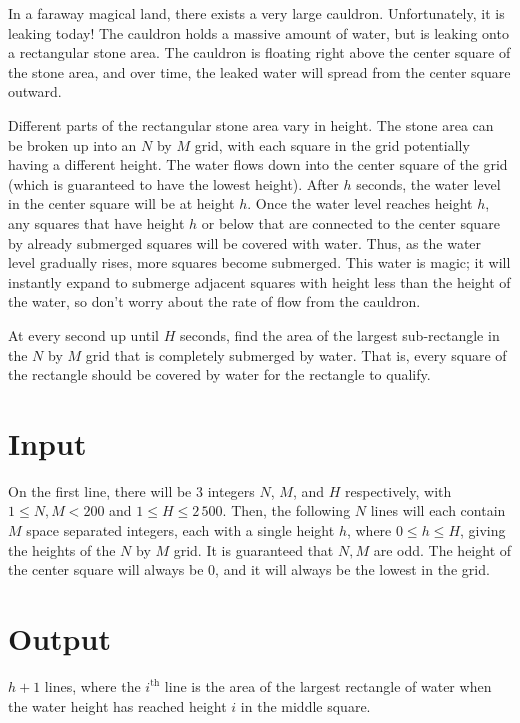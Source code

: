
In a faraway magical land, there exists a very large cauldron. Unfortunately, it is leaking today!
The cauldron holds a massive amount of water, but is leaking onto a rectangular stone area.
The cauldron is floating right above the center square of the stone area, and over time, the leaked water
will spread from the center square outward.

Different parts of the rectangular stone area vary in height. The stone area can be broken up into an $N$
by $M$ grid, with each square in the grid potentially having a different height. The water flows down into
the center square of the grid (which is guaranteed to have the lowest height). After $h$ seconds, the water
level in the center square will be at height $h$. Once the water level reaches height $h$, any squares that
have height $h$ or below that are connected to the center square by already submerged squares will be
covered with water. Thus, as the water level gradually rises, more squares become submerged. This water is
magic; it will instantly expand to submerge adjacent squares with height less than the height of the water,
so don't worry about the rate of flow from the cauldron.

At every second up until $H$ seconds, find the area of the largest sub-rectangle in the $N$ by $M$ grid that 
is completely submerged by water. That is, every square of the rectangle should be covered by water for the
rectangle to qualify.

\section*{Input}
On the first line, there will be $3$ integers $N$, $M$, and $H$ respectively, with $1 \le N, M < 200$
and $1 \le H \le 2\,500$. Then, the following $N$ lines will each contain $M$ space separated integers,
each with a single height $h$, where $0 \le h \le H$, giving the heights of the $N$ by $M$ grid.
It is guaranteed that $N, M$ are odd. The height of the center square will always be $0$, and it will
always be the lowest in the grid.

\section*{Output}
$h + 1$ lines, where the $i^\textrm{th}$ line is the area of the largest rectangle of water when the water height has reached height $i$ in the middle square. 
